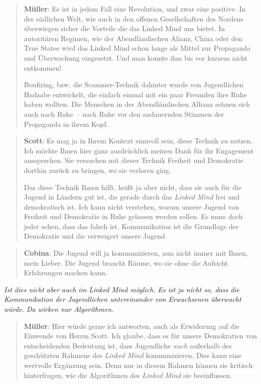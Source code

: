 \documentclass{scrartcl}
\newenvironment{frage}{\itshape}{}
\newenvironment{antworta}{
  \begin{quotation}
  }{
  \end{quotation}
}
\newenvironment{antwortb}{
  \begin{quotation}
  }{
  \end{quotation}
}
\newcommand{\name}[1]{\textbf{#1}}
\begin{document}
\begin{antworta}
\name{Müller}: Es ist in jedem Fall eine Revolution, und zwar eine
positive. In der südlichen Welt, wie auch in den offenen
Gesellschaften des Nordens überwiegen sicher die Vorteile
die das Linked Mind uns bietet. In autoritären Regimen, wie
der Abendländischen Alianz, China oder den True States wird
das Linked Mind schon lange als Mittel zur Propaganda und
Überwachung eingesetzt. Und man konnte ihm bis vor kurzem
nicht entkommen!

Bonfiring, bzw. die Scammer-Technik dahinter wurde von
Jugendlichen Hadzabe entwickelt, die einfach einmal mit ein
paar Freunden ihre Ruhe haben wollten. Die Menschen in der
Abendländischen Allianz sehnen sich auch nach Ruhe~– nach
Ruhe vor den andauernden Stimmen der Propaganda in ihrem
Kopf.
\end{antworta}


\begin{antwortb}
\name{Scott}: Es mag ja in Ihrem Kontext sinnvoll sein, diese
Technik zu nutzen. Ich möchte Ihnen hier ganz ausdrücklich
meinen Dank für ihr Engagement aussprechen. Sie versuchen
mit dieser  Technik Freiheit und Demokratie dorthin zurück
zu bringen, wo sie verloren ging.

Das diese Technik Ihnen hilft, heißt ja aber nicht, dass sie
auch für die Jugend in Ländern gut ist, die gerade durch das
\emph{Linked Mind} frei und demokratisch ist. Ich kann nicht
verstehen, warum unsere Jugend von Freiheit und Demokratie
in Ruhe gelassen werden sollen. Es muss doch jeder sehen,
dass das falsch ist. Kommunikation ist die Grundlage der
Demokratie und die verweigert unsere Jugend.
\end{antwortb}


\begin{antworta}
\name{Cobina}: Die Jugend will ja kommunizieren, nun nicht immer
mit Ihnen, mein Lieber. Die Jugend braucht Räume, wo sie
ohne die Aufsicht Erfahrungen machen kann.
\end{antworta}


\begin{frage}
Ist dies nicht aber auch im \emph{Linked Mind} möglich. Es ist ja
nicht so, dass die Kommunikation der Jugendlichen
untereinander von Erwachsenen überwacht würde. Da wirken nur Algorithmen.
\end{frage}


\begin{antworta}
\name{Müller}: Hier würde gerne ich antworten, auch als Erwiderung
auf die Einwende von Herrm Scott. Ich glaube, dass es für
unsere Demokratien von entscheidenden Bedeutung ist, dass
Jugendliche \emph{auch} außerhalb des geschützten Rahmens des
\emph{Linked Mind} kommunizieren. Dies kann eine wertvolle
Ergänzung sein. Denn nur in diesem Rahmen können sie
kritisch hinterfragen, wie die Algorithmen des \emph{Linked Mind}
sie beeinflussen.
\end{antworta}
\end{document}
